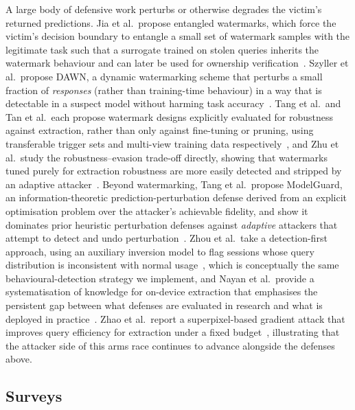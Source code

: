 \documentclass[journal,10pt]{IEEEtran}
\begin{document}
A large body of defensive work perturbs or otherwise degrades the victim's returned predictions.
Jia et al.\ propose entangled watermarks, which force the victim's decision boundary to entangle
a small set of watermark samples with the legitimate task such that a surrogate trained on stolen
queries inherits the watermark behaviour and can later be used for ownership
verification~\cite{jia2021entangled}. Szyller et al.\ propose DAWN, a dynamic watermarking scheme
that perturbs a small fraction of \emph{responses} (rather than training-time behaviour) in a
way that is detectable in a suspect model without harming task
accuracy~\cite{szyller2021dawn}. Tang et al.\ and Tan et al.\ each propose watermark designs
explicitly evaluated for robustness against extraction, rather than only against fine-tuning or
pruning, using transferable trigger sets and multi-view training data
respectively~\cite{tang2023exposingtheft,tan2023dnnwatermark}, and Zhu et al.\ study the
robustness--evasion trade-off directly, showing that watermarks tuned purely for extraction
robustness are more easily detected and stripped by an adaptive
attacker~\cite{zhu2024reliablewatermark}. Beyond watermarking, Tang et al.\ propose ModelGuard, an
information-theoretic prediction-perturbation defense derived from an explicit optimisation
problem over the attacker's achievable fidelity, and show it dominates prior heuristic
perturbation defenses against \emph{adaptive} attackers that attempt to detect and undo
perturbation~\cite{tang2024modelguard}. Zhou et al.\ take a detection-first approach, using an
auxiliary inversion model to flag sessions whose query distribution is inconsistent with normal
usage~\cite{zhou2024inversionguided}, which is conceptually the same behavioural-detection
strategy we implement, and Nayan et al.\ provide a systematisation of knowledge for on-device
extraction that emphasises the persistent gap between what defenses are evaluated in research and
what is deployed in practice~\cite{nayan2024sok}. Zhao et al.\ report a superpixel-based
gradient attack that improves query efficiency for extraction under a fixed
budget~\cite{zhao2024superpixel}, illustrating that the attacker side of this arms race continues
to advance alongside the defenses above.

\subsection{Surveys}
\end{document}
